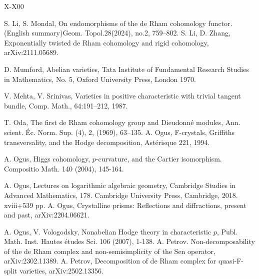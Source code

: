\documentclass[12pt, a4paper]{article}
\begin{document}
\begin{thebibliography}{X-X00}
	
S. Li, S. Mondal, On endomorphisms of the de Rham cohomology functor.(English summary)Geom. Topol.28(2024), no.2, 759–802.
 	S. Li, D. Zhang, Exponentially twisted de Rham cohomology and rigid cohomology, arXiv:2111.05689.

D. Mumford, Abelian varieties, Tata Institute of Fundamental Research
Studies in Mathematics, No. 5, Oxford University Press, London 1970.

    V. Mehta, V. Srinivas, Varieties in positive characteristic with trivial tangent bundle,
 Comp. Math., 64:191–212, 1987.

{}

     T. Oda, The first de Rham cohomology group and Dieudonné modules, Ann. scient.
 Éc. Norm. Sup. (4), 2, (1969), 63–135.
 	A. Ogus, F-crystals, Griffiths transversality, and the Hodge decomposition, Ast\'{e}risque 221, 1994.
 	
 	A. Ogus, Higgs cohomology, $p$-curvature, and the Cartier isomorphism. Compositio Math. 140 (2004), 145-164.
	
	 A. Ogus, Lectures on logarithmic algebraic geometry, Cambridge Studies in Advanced Mathematics, 178. Cambridge University Press, Cambridge, 2018. xviii+539 pp.  	
       A. Ogus, Crystalline prisms: Reflections and diffractions, present and past, arXiv:2204.06621.

     
 	A. Ogus, V. Vologodsky, Nonabelian Hodge theory in characteristic $p$,
 	Publ. Math. Inst. Hautes \'{e}tudes Sci. 106 (2007), 1-138.
A. Petrov. Non-decomposability of the de Rham complex and non-semisimplicity of
the Sen operator, arXiv:2302.11389.
A. Petrov, Decomposition of de Rham complex for quasi-F-split varieties, arXiv:2502.13356.

 		 

\end{thebibliography}
\end{document}
